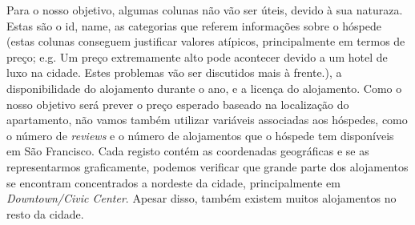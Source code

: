 \documentclass[justified, 11pt]{scrartcl}\usepackage[]{graphicx}\usepackage[]{xcolor}
\begin{document}
Para o nosso objetivo, algumas colunas não vão ser úteis, devido à sua naturaza. Estas são o id, name, as categorias que referem informações sobre o hóspede (estas colunas conseguem justificar valores atípicos, principalmente em termos de preço; e.g. Um preço extremamente alto pode acontecer devido a um hotel de luxo na cidade. Estes problemas vão ser discutidos mais à frente.), a disponibilidade do alojamento durante o ano, e a licença do alojamento. Como o nosso objetivo será prever o preço esperado baseado na localização do apartamento, não vamos também utilizar variáveis associadas aos hóspedes, como o número de \textit{reviews} e o número de alojamentos que o hóspede tem disponíveis em São Francisco. 
Cada registo contém as coordenadas geográficas e se as representarmos graficamente, podemos verificar que grande parte dos alojamentos se encontram concentrados a nordeste da cidade, principalmente em \textit{Downtown/Civic Center}. Apesar disso, também existem muitos alojamentos no resto da cidade.
\end{document}
